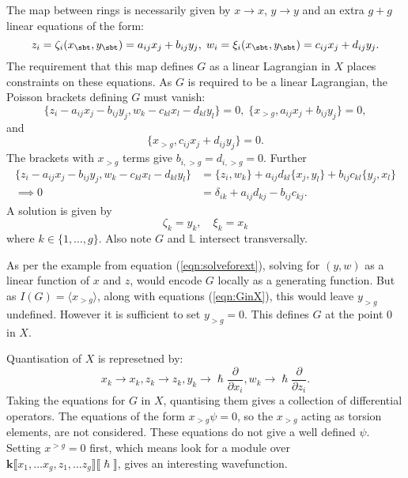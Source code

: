     The map between rings is necessarily given by \(x\rightarrow x\), \(y\rightarrow y\) and an extra \(g+g\) linear equations of the form:
    \[ z_i = \zeta_i(x_{\sbt},y_{\sbt}) = a_{ij} x_j + b_{ij} y_j, \; w_i = \xi_i(x_{\sbt},y_{\sbt}) = c_{ij} x_j+ d_{ij} y_j.\]
    The requirement that this map defines \(G\) as a linear Lagrangian in \(X\) places constraints on these equations. As \(G\) is required to be a linear Lagrangian, the Poisson brackets defining \(G\) must vanish:
    \[  \{ z_i - a_{ij} x_j - b_{ij} y_j,w_k -c_{kl}  x_l- d_{kl} y_l\}=0,\;  \{x_{>g},a_{ij} x_j + b_{ij} y_j\}=0,\] and 
    \[\{x_{>g}, c_{ij} x_j+ d_{ij} y_j\}=0. \]
    The brackets with \(x_{>g}\) terms give \(b_{i,>g} = d_{i,>g} = 0\).
    Further 
    \begin{align*}
         \{ z_i - a_{ij} x_j - b_{ij} y_j,w_k -c_{kl} x_l- d_{kl} y_l\} &= \{z_i,w_k\} + a_{ij}d_{kl}\{x_j,y_l\}+b_{ij}c_{kl}\{y_j,x_l\} \\
         \implies 0 &= \delta_{ik}+a_{ij}d_{kj} -b_{ij}c_{kj}. 
    \end{align*}
    A solution is given by 
    \begin{equation} 
    \label{eqn:GinX}
    \zeta_k= y_{k}, \quad \xi_k= x_{k}
    \end{equation} 
    where \(k \in \{1,\dots ,g\}\). Also note \( G\) and \(\mathbb{L}\) intersect transversally. 
    
    As per the example from equation (\ref{eqn:solveforext}), solving for \((y,w)\) as a linear function of \(x\) and \(z\), would encode \(G\) locally as a generating function. But as \(I(G) = \langle x_{>g}\rangle \), along with equations (\ref{eqn:GinX}), this would  leave \(y_{>g}\) undefined. However it is sufficient to set \( y_{>g} = 0\). This defines \(G\) at the point \(0\) in \(X\). 
    
    Quantisation of \(X\) is represetned by:
    \[ x_k \rightarrow x_k, z_k \rightarrow z_k, y_k \rightarrow \hslash \frac{\partial}{\partial x_i},  w_k \rightarrow \hslash \frac{\partial}{\partial z_i}.\] 
    Taking the equations for \(G\) in \(X\),  quantising them gives a collection of differential operators. The equations of the form \( x_{> g} \psi = 0\), so the \(x_{>g}\) acting as torsion elements, are not considered. These equations do not give a well defined \( \psi\). Setting \( x^{>g} =0\) first, which means look for a module over \( \mathbf{k} \lBrack x_1 , \dots x_g, z_1, \dots z_g\rBrack \lBrack \hslash \rBrack\), gives an interesting wavefunction.
    
